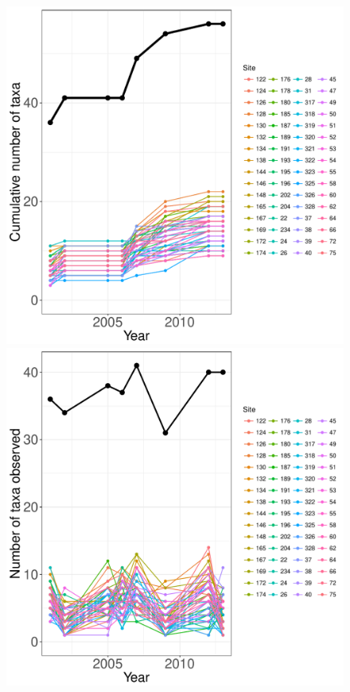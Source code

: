 \documentclass[11pt, oneside]{article}
\begin{document}
\begin{figure}[h!]
\centering
\includegraphics[scale = 0.4]{hbr-birds-sillett_species_accumulation_curve.pdf}
\includegraphics[scale = 0.4]{hbr-birds-sillett_num_taxa_over_time.pdf}

\end{figure}
\end{document}
